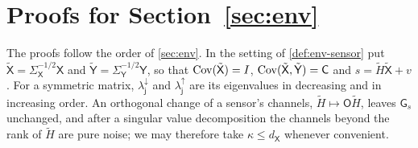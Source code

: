 \section{Proofs for \texorpdfstring{Section~\ref{sec:env}}{abstract environments}}\label{app:env}

The proofs follow the order of \cref{sec:env}. In the setting of \cref{def:env-sensor} put $\tilde{\mathsf X}=\Sigma_{\mathsf X}^{-1/2}\mathsf X$ and $\tilde{\mathsf Y}=\Sigma_{\mathsf Y}^{-1/2}\mathsf Y$, so that $\operatorname{Cov}(\tilde{\mathsf X})=I$, $\operatorname{Cov}(\tilde{\mathsf X},\tilde{\mathsf Y})=\mathsf C$ and $s=\tilde H\tilde{\mathsf X}+v$. For a symmetric matrix, $\lambda^\downarrow_{\mathsf j}$ and $\lambda^\uparrow_{\mathsf j}$ are its eigenvalues in decreasing and in increasing order. An orthogonal change of a sensor's channels, $\tilde H\mapsto\mathsf O\tilde H$, leaves $\mathsf G_s$ unchanged, and after a singular value decomposition the channels beyond the rank of $\tilde H$ are pure noise; we may therefore take $\kappa\le d_{\mathsf X}$ whenever convenient.

